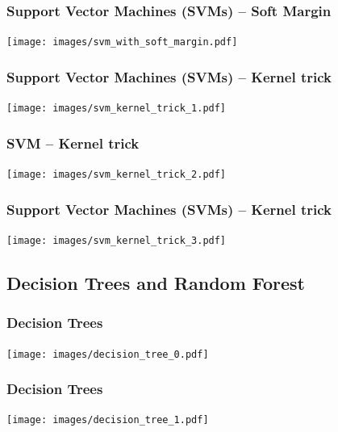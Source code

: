 \documentclass[aspectratio=169]{beamer}
\begin{document}
\begin{frame}
  \frametitle{Support Vector Machines (SVMs) -- Soft Margin}
  \begin{center}
    \texttt{[image: images/svm\_with\_soft\_margin.pdf]}
  \end{center}
\end{frame}

\begin{frame}
  \frametitle{Support Vector Machines (SVMs) -- Kernel trick}
  \begin{center}
    \texttt{[image: images/svm\_kernel\_trick\_1.pdf]}
  \end{center}
\end{frame}

\begin{frame}
  \frametitle{SVM -- Kernel trick}
  \begin{center}
    \texttt{[image: images/svm\_kernel\_trick\_2.pdf]}
  \end{center}
\end{frame}

\begin{frame}
  \frametitle{Support Vector Machines (SVMs) -- Kernel trick}
  \begin{center}
    \texttt{[image: images/svm\_kernel\_trick\_3.pdf]}
  \end{center}
\end{frame}

\subsection{Decision Trees and Random Forest}

\setcounter{tocdepth}{2}
\begin{frame}{}
   \tableofcontents[currentsubsection]
\end{frame}


\begin{frame}
  \frametitle{Decision Trees}
  \begin{center}
    \texttt{[image: images/decision\_tree\_0.pdf]}
  \end{center}  
\end{frame}

\begin{frame}
  \frametitle{Decision Trees}
  \begin{center}
    \texttt{[image: images/decision\_tree\_1.pdf]}
  \end{center}  
\end{frame}
\end{document}
